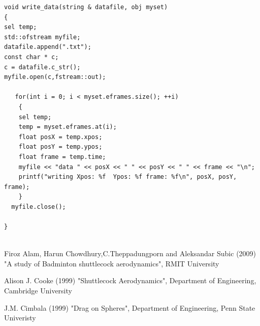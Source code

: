 \documentclass[paper=a4, fontsize=11pt, abstract=on]{scrartcl}
\numberwithin{equation}{section}		%
\numberwithin{figure}{section}			%
\numberwithin{table}{section}				%
\begin{document}
\begin{lstlisting}
void write_data(string & datafile, obj myset)
{
sel temp;
std::ofstream myfile;
datafile.append(".txt");
const char * c;
c = datafile.c_str();
myfile.open(c,fstream::out);

   for(int i = 0; i < myset.eframes.size(); ++i)
    {
    sel temp;
    temp = myset.eframes.at(i);    
    float posX = temp.xpos;
    float posY = temp.ypos;
    float frame = temp.time;    
    myfile << "data " << posX << " " << posY << " " << frame << "\n";
    printf("writing Xpos: %f  Ypos: %f frame: %f\n", posX, posY, frame); 
    }
  myfile.close();

}


\end{lstlisting}


\begin{thebibliography}{99} %
Firoz Alam, Harun Chowdhury,C.Theppadungporn and Aleksandar Subic  (2009)
\newblock "A study of Badminton shuttlecock aerodynamics",  RMIT University


 Alison J. Cooke (1999)
\newblock "Shuttlecock Aerodynamics", Department of Engineering, Cambridge University


 J.M. Cimbala (1999)
\newblock "Drag on Spheres", Department of Engineering, Penn State Univeristy
\end{thebibliography}


\end{document}
